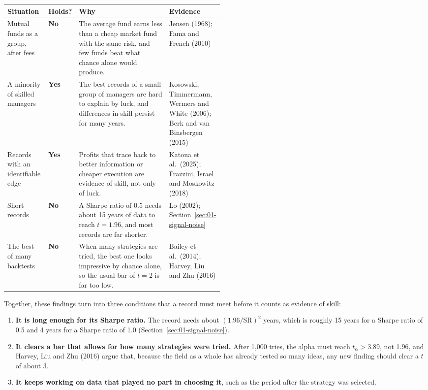 \begin{center}
\small
\begin{tabularx}{\linewidth}{@{}>{\raggedright\arraybackslash}p{0.19\linewidth}>{\raggedright\arraybackslash}p{0.10\linewidth}>{\raggedright\arraybackslash}X>{\raggedright\arraybackslash}p{0.22\linewidth}@{}}
\toprule
Situation & Holds? & Why & Evidence \\
\midrule
Mutual funds as a group, after fees & \textbf{No} & The average fund earns less than a cheap market fund with the same risk, and few funds beat what chance alone would produce. & Jensen (1968); Fama and French (2010) \\
A minority of skilled managers & \textbf{Yes} & The best records of a small group of managers are hard to explain by luck, and differences in skill persist for many years. & Kosowski, Timmermann, Wermers and White (2006); Berk and van Binsbergen (2015) \\
Records with an identifiable edge & \textbf{Yes} & Profits that trace back to better information or cheaper execution are evidence of skill, not only of luck. & Katona et al.\ (2025); Frazzini, Israel and Moskowitz (2018) \\
Short records & \textbf{No} & A Sharpe ratio of 0.5 needs about 15 years of data to reach $t = 1.96$, and most records are far shorter. & Lo (2002); Section~\ref{sec:01-signal-noise} \\
The best of many backtests & \textbf{No} & When many strategies are tried, the best one looks impressive by chance alone, so the usual bar of $t = 2$ is far too low. & Bailey et al.\ (2014); Harvey, Liu and Zhu (2016) \\
\bottomrule
\end{tabularx}
\end{center}

Together, these findings turn into three conditions that a record must meet before it counts as evidence of skill:

\begin{enumerate}
  \item \textbf{It is long enough for its Sharpe ratio.} The record needs about $(1.96/\mathrm{SR})^2$ years, which is roughly 15 years for a Sharpe ratio of 0.5 and 4 years for a Sharpe ratio of 1.0 (Section~\ref{sec:01-signal-noise}).
  \item \textbf{It clears a bar that allows for how many strategies were tried.} After 1,000 tries, the alpha must reach $t_\alpha > 3.89$, not 1.96, and Harvey, Liu and Zhu (2016) argue that, because the field as a whole has already tested so many ideas, any new finding should clear a $t$ of about 3.
  \item \textbf{It keeps working on data that played no part in choosing it}, such as the period after the strategy was selected.
\end{enumerate}

